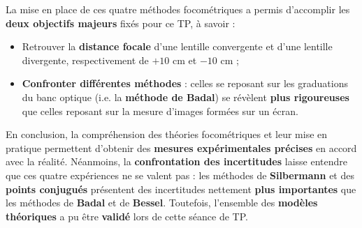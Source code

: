 La mise en place de ces quatre méthodes focométriques
a permis d'accomplir les \textbf{deux objectifs majeurs} fixés pour ce TP,
à savoir : 

\begin{itemize}
    \item Retrouver la \textbf{distance focale} d'une lentille convergente et d'une lentille divergente,
    respectivement de $+10$ cm et $-10$ cm ;
    \item \textbf{Confronter différentes méthodes} :
    celles se reposant sur les graduations du banc optique (i.e. la \textbf{méthode de Badal})
    se révèlent \textbf{plus rigoureuses} que celles reposant sur la mesure d'images formées sur un écran.
\end{itemize}

En conclusion, la compréhension des théories focométriques et leur mise en pratique
permettent d'obtenir des \textbf{mesures expérimentales précises} en accord avec la réalité.
Néanmoins, la \textbf{confrontation des incertitudes} laisse entendre que ces quatre expériences ne se valent pas :
les méthodes de \textbf{Silbermann} et des \textbf{points conjugués} présentent des incertitudes
nettement \textbf{plus importantes} que les méthodes de \textbf{Badal} et de \textbf{Bessel}.
Toutefois, l'ensemble des \textbf{modèles théoriques} a pu être \textbf{validé} lors de cette séance de TP.